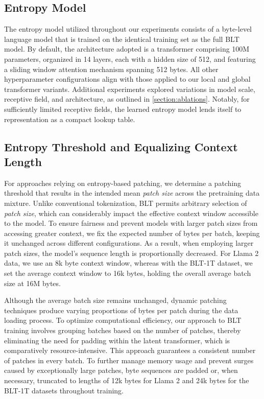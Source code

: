 \subsection{Entropy Model} The entropy model utilized throughout our experiments consists of a byte-level language model that is trained on the identical training set as the full {\textsc BLT} model. By default, the architecture adopted is a transformer comprising 100M parameters, organized in 14 layers, each with a hidden size of 512, and featuring a sliding window attention mechanism spanning 512 bytes. All other hyperparameter configurations align with those applied to our local and global transformer variants. Additional experiments explored variations in model scale, receptive field, and architecture, as outlined in \autoref{section:ablations}. Notably, for sufficiently limited receptive fields, the learned entropy model lends itself to representation as a compact lookup table.

\subsection{Entropy Threshold and Equalizing Context Length} For approaches relying on entropy-based patching, we determine a patching threshold that results in the intended mean \textit{patch size} across the pretraining data mixture. Unlike conventional tokenization, {\textsc BLT} permits arbitrary selection of \textit{patch size}, which can considerably impact the effective context window accessible to the model. To ensure fairness and prevent models with larger patch sizes from accessing greater context, we fix the expected number of bytes per batch, keeping it unchanged across different configurations. As a result, when employing larger patch sizes, the model’s sequence length is proportionally decreased. For Llama 2 data, we use an 8k byte context window, whereas with the {\textsc BLT}-1T dataset, we set the average context window to 16k bytes, holding the overall average batch size at 16M bytes.

Although the average batch size remains unchanged, dynamic patching techniques produce varying proportions of bytes per patch during the data loading process. To optimize computational efficiency, our approach to {\textsc BLT} training involves grouping batches based on the number of patches, thereby eliminating the need for padding within the latent transformer, which is comparatively resource-intensive. This approach guarantees a consistent number of patches in every batch. To further manage memory usage and prevent surges caused by exceptionally large patches, byte sequences are padded or, when necessary, truncated to lengths of 12k bytes for Llama 2 and 24k bytes for the {\textsc BLT}-1T datasets throughout training.

